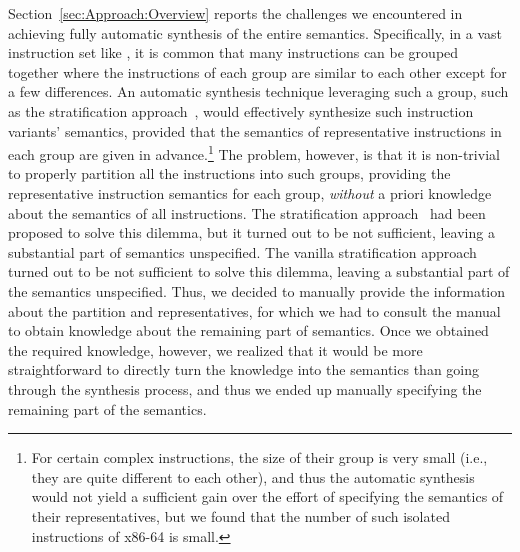 Section~\ref{sec:Approach:Overview} reports the challenges we encountered in achieving fully automatic synthesis of the entire \ISA semantics.
Specifically, in a vast instruction set like \ISA {}, it is common that many instructions can be grouped together where the instructions of each group are similar to each other except for a few differences.
An automatic synthesis technique leveraging such a group, such as the stratification approach~\cite{Heule2016a}, would effectively synthesize such instruction variants' semantics, provided that the semantics of representative instructions in each group are given in advance.\footnote{For certain complex instructions, the size of their group is very small (i.e., they are quite different to each other), and thus the automatic synthesis would not yield a sufficient gain over the effort of specifying the semantics of their representatives, but we found that the number of such isolated instructions of x86-64 is small.}
The problem, however, is that it is non-trivial to properly partition all the instructions into such groups, providing the representative instruction semantics for each group, \emph{without} a priori knowledge about the semantics of all instructions.
The stratification approach~\cite{Heule2016a} had been proposed to solve this 
dilemma, but it turned out to be not sufficient, leaving a substantial part of 
semantics unspecified.
The vanilla stratification approach~\cite{Heule2016a} turned out to be not sufficient to solve this dilemma, leaving a substantial part of the semantics unspecified.
Thus, we decided to manually provide the information about the partition and representatives, for which we had to consult the manual to obtain knowledge about the remaining part of semantics.
Once we obtained the required knowledge, however, we realized that it would be more straightforward to directly turn the knowledge into the semantics than going through the synthesis process, and thus we ended up manually specifying the remaining part of the semantics.


